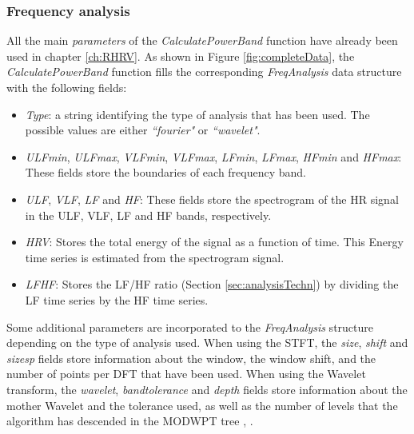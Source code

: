 \documentclass[12pt,lot, lof]{puthesis}
\begin{document}
\subsubsection{Frequency analysis} All the main \textit{parameters} of the 
\textit{CalculatePowerBand} function have already been used in chapter 
\ref{ch:RHRV}. As shown in Figure \ref{fig:completeData}, the 
\textit{CalculatePowerBand} function fills the corresponding  
\textit{FreqAnalysis} data structure with the following fields:
\begin{itemize}
\item \textit{Type}: a string identifying the type of analysis that has been 
used. The possible values are either \textit{``fourier"} or \textit{``wavelet"}.
\item \textit{ULFmin}, \textit{ULFmax}, \textit{VLFmin}, \textit{VLFmax}, 
\textit{LFmin}, \textit{LFmax}, \textit{HFmin} and \textit{HFmax}: These fields 
store the boundaries of each frequency band.
\item \textit{ULF}, \textit{VLF}, \textit{LF} and \textit{HF}:   These fields 
store the spectrogram of the HR signal in the  ULF, VLF, LF and HF bands, 
respectively.
\item \textit{HRV}: Stores the total energy of the signal as a function of 
time. This Energy time series is estimated from the spectrogram signal.
\item \textit{LFHF}: Stores the LF/HF ratio (Section \ref{sec:analysisTechn}) 
by dividing the LF time series by the HF time series.
\end{itemize}
Some additional parameters are incorporated to the \textit{FreqAnalysis} 
structure depending on the type of analysis used. When using the \gls{STFT}, 
the \textit{size}, \textit{shift} and \textit{sizesp} fields store information 
about the window, the window shift, and the number of points per \gls{DFT} that 
have been used. When using the Wavelet transform, the \textit{wavelet}, 
\textit{ bandtolerance} and \textit{depth} fields store information about the 
mother Wavelet and the tolerance used, as well as the number of levels that the 
algorithm has descended in the \gls{MODWPT} tree \cite{waveletBiosignals}, 
\cite{waveletArticle}.\\
\end{document}
